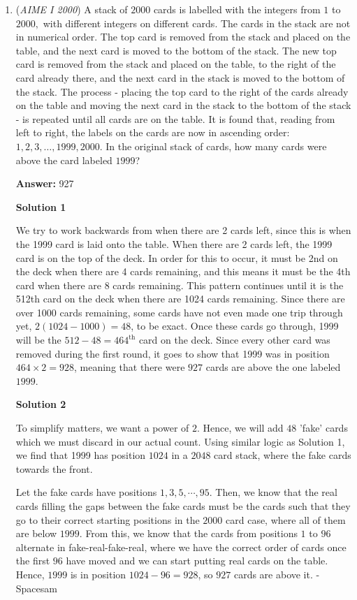 \begin{enumerate}
 


	\item (\textit{AIME I 2000}) A stack of $2000$ cards is labelled with the integers from $1$ to $2000,$ with different integers on different cards. The cards in the stack are not in numerical order. The top card is removed from the stack and placed on the table, and the next card is moved to the bottom of the stack. The new top card is removed from the stack and placed on the table, to the right of the card already there, and the next card in the stack is moved to the bottom of the stack. The process - placing the top card to the right of the cards already on the table and moving the next card in the stack to the bottom of the stack - is repeated until all cards are on the table. It is found that, reading from left to right, the labels on the cards are now in ascending order: $1,2,3,\ldots,1999,2000.$ In the original stack of cards, how many cards were above the card labeled $1999$?


 
 \textbf{Answer: }927



\textbf{Solution 1}

We try to work backwards from when there are 2 cards left, since this is when the 1999 card is laid onto the table. When there are 2 cards left, the 1999 card is on the top of the deck. In order for this to occur, it must be 2nd on the deck when there are 4 cards remaining, and this means it must be the 4th card when there are 8 cards remaining. This pattern continues until it is the 512th card on the deck when there are 1024 cards remaining. Since there are over 1000 cards remaining, some cards have not even made one trip through yet, $2(1024 - 1000) = 48$, to be exact. Once these cards go through, 1999 will be the $512 - 48 = 464^\text{th}$ card on the deck. Since every other card was removed during the first round, it goes to show that 1999 was in position $464 \times 2 = 928$, meaning that there were $\boxed{927}$ cards are above the one labeled $1999$.

 



\textbf{Solution 2}

To simplify matters, we want a power of $2$. Hence, we will add $48$ 'fake' cards which we must discard in our actual count. Using similar logic as Solution 1, we find that 1999 has position $1024$ in a $2048$ card stack, where the fake cards towards the front.

 Let the fake cards have positions $1, 3, 5, \cdots, 95$. Then, we know that the real cards filling the gaps between the fake cards must be the cards such that they go to their correct starting positions in the $2000$ card case, where all of them are below $1999$. From this, we know that the cards from positions $1$ to $96$ alternate in fake-real-fake-real, where we have the correct order of cards once the first $96$ have moved and we can start putting real cards on the table. Hence, $1999$ is in position $1024 - 96 = 928$, so $\boxed{927}$ cards are above it. - Spacesam


\end{enumerate}

